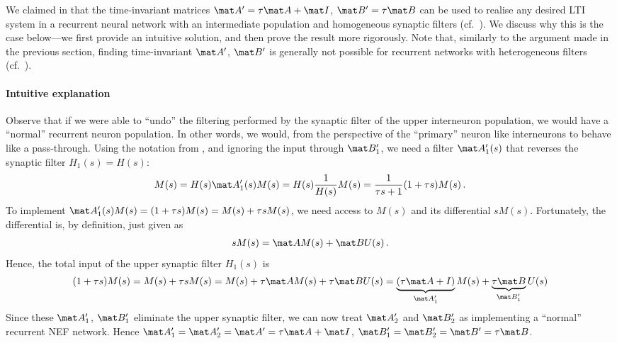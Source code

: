We claimed in  that the time-invariant matrices $\mat A' = \tau \mat A + \mat I$, $\mat B' = \tau \mat B$ can be used to realise any desired LTI system in a recurrent neural network with an intermediate population and homogeneous synaptic filters (cf.~).
We discuss why this is the case below---we first provide an intuitive solution, and then prove the result more rigorously.
Note that, similarly to the argument made in the previous section, finding time-invariant $\mat A'$, $\mat B'$ is generally not possible for recurrent networks with heterogeneous filters (cf.~).

\paragraph{Intuitive explanation}
Observe that if we were able to \enquote{undo} the filtering performed by the synaptic filter of the upper interneuron population, we would have a \enquote{normal} recurrent neuron population. In other words, we would, from the perspective of the \enquote{primary} neuron like interneurons to behave like a pass-through.
Using the notation from , and ignoring the input through $\mat B_1'$, we need a filter $\mat A'_1(s)$ that reverses the synaptic filter $H_1(s) = H(s)$:
\begin{align*}
	M(s) = H(s) \mat A'_1(s) M(s) = H(s) \frac{1}{H(s)} M(s) = \frac{1}{\tau s + 1} (1 + \tau s) M(s) \,.
\end{align*}
To implement $\mat A'_1(s) M(s) = (1 + \tau s) M(s) =  M(s) + \tau s M(s)$, we need access to $M(s)$ and its differential $s M(s)$. Fortunately, the differential is, by definition, just given as
\begin{align*}
	s M(s) = \mat A M(s) + \mat B U(s) \,.
\end{align*}
Hence, the total input of the upper synaptic filter $H_1(s)$ is
\begin{align*}
	(1 + \tau s) M(s) = M(s) + \tau s M(s) = M(s) + \tau \mat A M(s) + \tau \mat B U(s) = \underbrace{(\tau \mat A + I)}_{\mat A_1'} M(s) + \underbrace{\tau \mat B}_{\mat B_1'} U(s)
\end{align*}
Since these $\mat A_1'$, $\mat B_1'$ eliminate the upper synaptic filter, we can now treat $\mat A'_2$ and $\mat B_2'$ as implementing a \enquote{normal} recurrent NEF network.
Hence $\mat A_1' = \mat A_2' = \mat A' = \tau \mat A + \mat I$, $\mat B_1' = \mat B_2' = \mat B' = \tau \mat B$.

